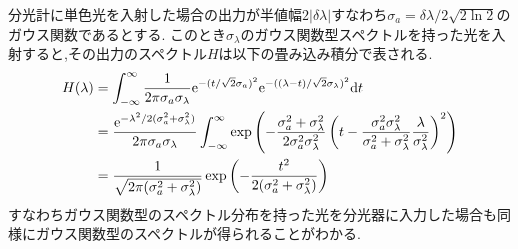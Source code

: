 分光計に単色光を入射した場合の出力が半値幅$2|\delta\lambda|$すなわち$\sigma_a=\delta\lambda/2\sqrt{2\ln 2}$のガウス関数であるとする.
このとき$\sigma_\lambda$のガウス関数型スペクトルを持った光を入射すると,その出力のスペクトル$H$は以下の畳み込み積分で表される.
\begin{align}
  \begin{split}
    H(\lambda)&=\int_{-\infty}^{\infty}\frac{1}{2\pi\sigma_a\sigma_\lambda}{\rm e}^{-(t/\sqrt{2}\sigma_a)^2}{\rm e}^{-((\lambda-t)/\sqrt{2}\sigma_\lambda)^2}{\rm d}t\\
    &=\frac{{\rm e}^{-\lambda^2/2(\sigma_a^2+\sigma_\lambda^2)}}{2\pi\sigma_a\sigma_\lambda}\int^\infty_{-\infty}\exp\left(-\frac{\sigma_a^2+\sigma_\lambda^2}{2\sigma_a^2\sigma_\lambda^2}\left(t-\frac{\sigma_a^2\sigma_\lambda^2}{\sigma_a^2+\sigma_\lambda^2}\frac{\lambda}{\sigma_\lambda^2}\right)^2\right)\\
    &=\frac{1}{\sqrt{2\pi(\sigma_a^2+\sigma_\lambda^2)}}\exp\left(-\frac{t^2}{2(\sigma_a^2+\sigma_\lambda^2)}\right)
  \end{split}
\end{align}
すなわちガウス関数型のスペクトル分布を持った光を分光器に入力した場合も同様にガウス関数型のスペクトルが得られることがわかる.
